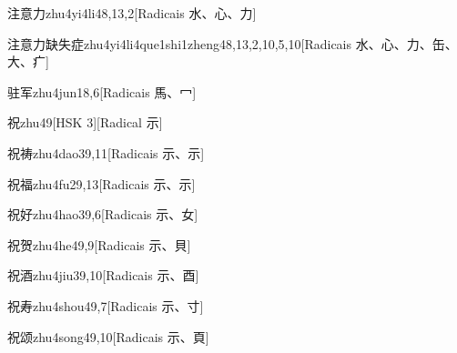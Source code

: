 \begin{entry}{注意力}{zhu4yi4li4}{8,13,2}[Radicais ⽔、⼼、⼒]
\end{entry}

\begin{entry}{注意力缺失症}{zhu4yi4li4que1shi1zheng4}{8,13,2,10,5,10}[Radicais ⽔、⼼、⼒、⽸、⼤、⽧]
\end{entry}

\begin{entry}{驻军}{zhu4jun1}{8,6}[Radicais ⾺、⼍]
\end{entry}

\begin{entry}{祝}{zhu4}{9}[HSK 3][Radical ⽰]
\end{entry}

\begin{entry}{祝祷}{zhu4dao3}{9,11}[Radicais ⽰、⽰]
\end{entry}

\begin{entry}{祝福}{zhu4fu2}{9,13}[Radicais ⽰、⽰]
\end{entry}

\begin{entry}{祝好}{zhu4hao3}{9,6}[Radicais ⽰、⼥]
\end{entry}

\begin{entry}{祝贺}{zhu4he4}{9,9}[Radicais ⽰、⾙]
\end{entry}

\begin{entry}{祝酒}{zhu4jiu3}{9,10}[Radicais ⽰、⾣]
\end{entry}

\begin{entry}{祝寿}{zhu4shou4}{9,7}[Radicais ⽰、⼨]
\end{entry}

\begin{entry}{祝颂}{zhu4song4}{9,10}[Radicais ⽰、⾴]
\end{entry}

